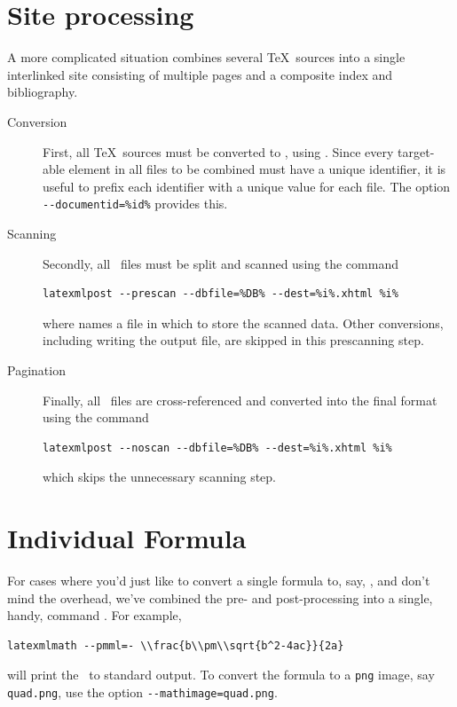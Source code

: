 \documentclass{book}
\newcommand{\shellcode}{\lstinline[style=shell]}
\begin{document}
\section[Sites]{Site processing}\label{usage.site}
A more complicated situation combines several \TeX\ sources
into a single interlinked site consisting of multiple pages
and a composite index and bibliography.

\begin{description}
\item[Conversion] First, all \TeX\ sources must be converted
   to \XML, using .  Since every target-able element
   in all files to be combined must have a unique identifier, it is useful to
   prefix each identifier with a unique value for each file. 
   The  option \shellcode{--documentid=%

 \item[Scanning] Secondly, all \XML\ files must be split and scanned using
  the command
  \begin{lstlisting}[style=shell]
   latexmlpost --prescan --dbfile=%DB% --dest=%i%.xhtml %i%
  \end{lstlisting}
  where  names a file in which to store the scanned data.
  Other conversions, including writing the output file, are skipped in this prescanning step.
 
 \item[Pagination] Finally, all \XML\ files are cross-referenced and converted into
   the final format using the command
   \begin{lstlisting}[style=shell]
     latexmlpost --noscan --dbfile=%DB% --dest=%i%.xhtml %i%
   \end{lstlisting}
   which skips the unnecessary scanning step.
\end{description}

\section{Individual Formula}\label{usage.latexmlmath}
For cases where you'd just like to convert a single formula to, say, \MathML,
and don't mind the overhead, we've combined the pre- and post-processing into
a single, handy, command .  For example,
\begin{lstlisting}[style=shell]
  latexmlmath --pmml=- \\frac{b\\pm\\sqrt{b^2-4ac}}{2a}
\end{lstlisting}
will print the \MathML\ to standard output.  
To convert the formula to a \texttt{png} image, say \texttt{quad.png},
use the option \shellcode{--mathimage=quad.png}.
\end{document}
